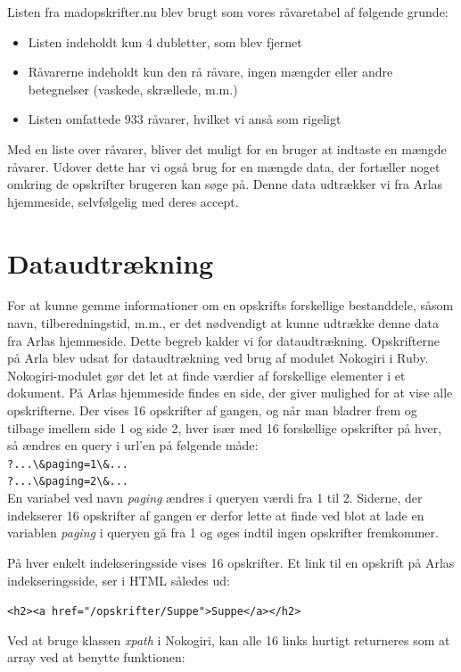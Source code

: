 Listen fra madopskrifter.nu blev brugt som vores råvaretabel af følgende grunde:

\begin{itemize}
\item Listen indeholdt kun 4 dubletter, som blev fjernet
\item Råvarerne indeholdt kun den rå råvare, ingen mængder eller andre betegnelser (vaskede, skrællede, m.m.)
\item Listen omfattede 933 råvarer, hvilket vi anså som rigeligt
\end{itemize}

Med en liste over råvarer, bliver det muligt for en bruger at indtaste en mængde råvarer. Udover dette har vi også brug for en mængde data, der fortæller noget omkring de opskrifter brugeren kan søge på. Denne data udtrækker vi fra Arlas hjemmeside, selvfølgelig med deres accept.

\section{Dataudtrækning}
For at kunne gemme informationer om en opskrifts forskellige bestanddele, såsom navn, tilberedningstid, m.m., er det nødvendigt at kunne udtrække denne data fra Arlas hjemmeside. Dette begreb kalder vi for dataudtrækning. 
Opskrifterne på Arla blev udsat for dataudtrækning ved brug af modulet Nokogiri i Ruby. Nokogiri-modulet gør det let at finde værdier af forskellige elementer i et dokument. På Arlas hjemmeside findes en side, der giver mulighed for at vise alle opskrifterne. Der vises 16 opskrifter af gangen, og når man bladrer frem og tilbage imellem side 1 og side 2, hver især med 16 forskellige opskrifter på hver, så ændres en query i url'en på følgende måde: \\
\lstinline{?...\&paging=1\&...} \\
\lstinline{?...\&paging=2\&...} \\
En variabel ved navn \textit{paging} ændres i queryen værdi fra 1 til 2. Siderne, der indekserer 16 opskrifter af gangen er derfor lette at finde ved blot at lade en variablen \textit{paging} i queryen gå fra 1 og øges indtil ingen opskrifter fremkommer.

På hver enkelt indekseringsside vises 16 opskrifter. Et link til en opskrift på Arlas indekseringsside, ser i HTML således ud:

\lstinline{<h2><a href="/opskrifter/Suppe">Suppe</a></h2>}

Ved at bruge klassen \textit{xpath} i Nokogiri, kan alle 16 links hurtigt returneres som at array ved at benytte funktionen:

